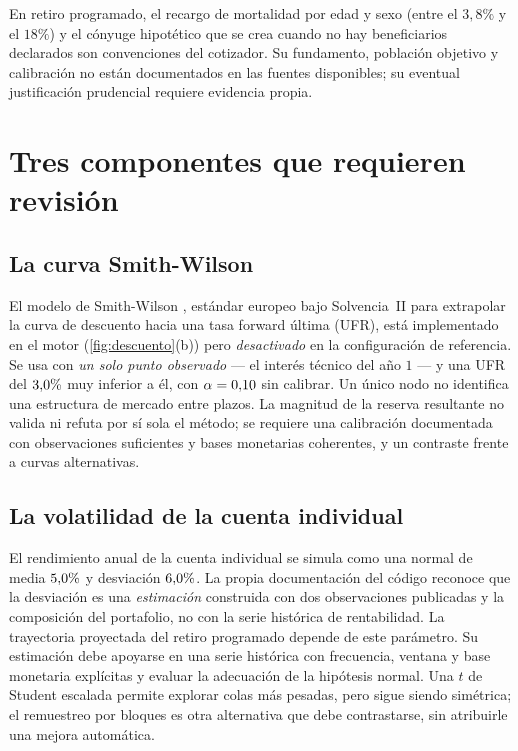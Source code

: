 En retiro programado, el recargo de mortalidad por edad y sexo (entre el $3{,}8\%$
y el $18\%$) y el cónyuge hipotético que se crea cuando no hay beneficiarios
declarados son convenciones del cotizador. Su fundamento, población objetivo y
calibración no están documentados en las fuentes disponibles; su eventual
justificación prudencial requiere evidencia propia.

\section{Tres componentes que requieren revisión}
\label{sec:variables-debiles}

\subsection{La curva Smith-Wilson}

El modelo de Smith-Wilson \citep{smith2001,eiopa2019}, estándar europeo bajo
Solvencia~II para extrapolar la curva de descuento hacia una tasa forward última
(UFR), está implementado en el motor (\cref{fig:descuento}(b)) pero
\emph{desactivado} en la configuración de referencia. Se
usa con \emph{un solo punto observado} --- el interés técnico del año $1$ --- y
una UFR del $3{,}0\%$ muy inferior a él, con $\alpha=0{,}10$ sin
calibrar. Un único nodo no identifica una estructura de mercado entre plazos.
La magnitud de la reserva resultante no valida ni refuta por sí sola el método;
se requiere una calibración documentada con observaciones suficientes y bases
monetarias coherentes, y un contraste frente a curvas alternativas.

\subsection{La volatilidad de la cuenta individual}

El rendimiento anual de la cuenta individual se simula como una normal de media
$5{,}0\%$ y desviación $6{,}0\%$. La propia documentación del código
reconoce que la desviación es una \emph{estimación} construida con dos
observaciones publicadas y la composición del portafolio, no con la serie
histórica de rentabilidad. La trayectoria proyectada del retiro programado depende
de este parámetro. Su estimación debe apoyarse en una serie histórica con
frecuencia, ventana y base monetaria explícitas y evaluar la adecuación de la
hipótesis normal. Una $t$ de Student escalada permite explorar colas más pesadas,
pero sigue siendo simétrica; el remuestreo por bloques es otra alternativa que
debe contrastarse, sin atribuirle una mejora automática.

